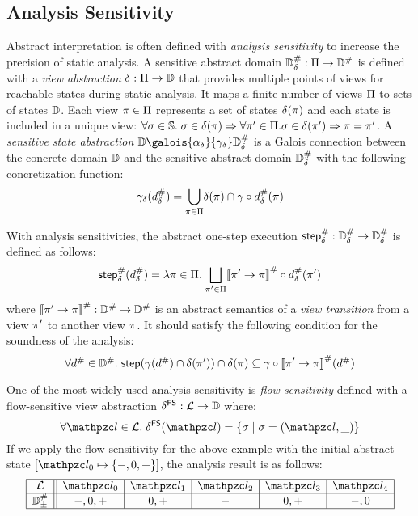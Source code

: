 \subsection{Analysis Sensitivity}\label{sec:sens}

Abstract interpretation is often defined with \textit{analysis sensitivity} to
increase the precision of static analysis.  A sensitive abstract domain
${\mathbb{D}}^{\#}_\delta: \Pi \rightarrow {\mathbb{D}}^{\#}$ is defined with a \textit{view
abstraction} $\delta: \Pi \rightarrow \mathbb{D}$ that provides multiple points
of views for reachable states during static analysis.  It maps a finite number
of views $\Pi$ to sets of states $\mathbb{D}$. Each view $\pi \in \Pi$
represents a set of states $\delta(\pi)$ and each state is included
in a unique view: $\forall \sigma \in \mathbb{S}. \; \sigma \in \delta(\pi)
\Rightarrow \forall \pi' \in \Pi. \sigma \in \delta(\pi') \Rightarrow \pi = \pi'$.
A \textit{sensitive state
abstraction} $\dom \galois{\alpha_\viewmap}{\gamma_\viewmap} \sabsdom$ is a
Galois connection between the concrete domain $\mathbb{D}$ and the sensitive abstract
domain ${\mathbb{D}}^{\#}_\delta$ with the following concretization function:
\[
  \gamma_\delta({{d}^{\#}_\delta}) = \underset{\pi \in \Pi}{\bigcup}
  {\delta(\pi) \cap \gamma \circ {{d}^{\#}_\delta}(\pi)}
\]

With analysis sensitivities, the abstract one-step execution ${\textsf{step}}^{\#}_\delta:
{\mathbb{D}}^{\#}_\delta \rightarrow {\mathbb{D}}^{\#}_\delta$ is defined as follows:
\[
  {\textsf{step}}^{\#}_\delta({{d}^{\#}_\delta}) = \lambda \pi \in \Pi. \; \underset{\pi' \in
  \Pi}{\bigsqcup}{{\llbracket \pi' \rightarrow \pi \rrbracket}^{\#} \circ {{d}^{\#}_\delta}(\pi')}
\]
where ${\llbracket \pi' \rightarrow \pi \rrbracket}^{\#}: {\mathbb{D}}^{\#} \rightarrow {\mathbb{D}}^{\#}$ is an abstract
semantics of a \textit{view transition} from a view $\pi'$ to another view
$\pi$.  It should satisfy the following condition for the soundness of the
analysis:
\[
  \forall {d}^{\#} \in {\mathbb{D}}^{\#}. \; \textsf{step}(\gamma({d}^{\#}) \cap \delta(\pi'))
  \cap \delta(\pi) \subseteq \gamma \circ
  {\llbracket \pi' \rightarrow \pi\rrbracket}^{\#}({d}^{\#})
\]

One of the most widely-used analysis sensitivity is \textit{flow sensitivity}
defined with a flow-sensitive view abstraction $\delta^{\textsf{FS}}: \mathcal{L}
\rightarrow \mathbb{D}$ where:
\[
  \forall \lab\in\labset. \; \fsviewmap(\lab) = \{ \st \mid \st = (\lab, \_) \}
\]
If we apply the flow sensitivity for the above example with the initial abstract
state $[ \lab_0 \mapsto \{ -, 0, + \} ]$, the analysis result is as follows:
\[
  \begin{array}{|c||c|c|c|c|c|}\hline
    \labset & \lab_0 & \lab_1 & \lab_2 & \lab_3 & \lab_4\\\hline
    \absdom_\pm & -, 0, + & 0, + & - & 0, + & -, 0\\\hline
  \end{array}
\]


